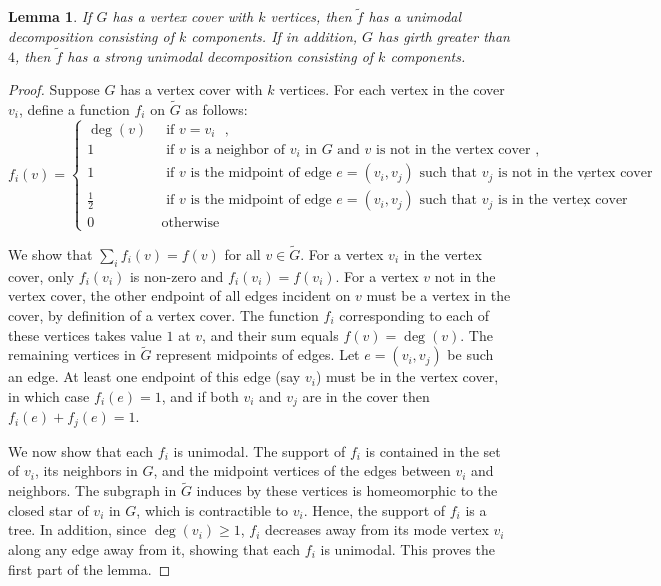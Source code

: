 \documentclass[11pt]{article}
\newtheorem{lem}[thm]{Lemma}
\begin{document}
\begin{lem}
    If $G$ has a vertex cover with $k$ vertices, then $\tilde{f}$ has a unimodal decomposition consisting of $k$ components. If in addition, $G$ has girth greater than $4$, then $\tilde{f}$ has a strong unimodal decomposition consisting of $k$ components.
\end{lem}
\begin{proof}
 Suppose $G$ has a vertex cover with $k$ vertices. For each vertex in the cover $v_i$, define a function $f_i$ on $\tilde{G}$ as follows:
 \[
 	f_i(v) = \begin{cases}
	\deg(v) & \ \text{ if $v = v_i$ }, \\
	1 & \ \text{ if $v$ is a neighbor of $v_i$ in $G$ and $v$ is not in the vertex cover },\\
	1 & \ \text{ if $v$ is the midpoint of edge $e = (v_i, v_j)$ such that $v_j$ is not in the vertex cover },\\
	\frac{1}{2} & \ \text{ if $v$ is the midpoint of edge $e = (v_i, v_j)$ such that $v_j$ is in the vertex cover }, \\
	0 & \ \text{otherwise}
	\end{cases}
 \]
 
 We show that $\sum_i f_i(v) = f(v)$ for all $v \in \tilde{G}$. For a vertex $v_i$ in the vertex cover, only $f_i(v_i)$ is non-zero and $f_i(v_i) = f(v_i)$. For a vertex $v$ not in the vertex cover, the other endpoint of all edges incident on $v$ must be a vertex in the cover, by definition of a vertex cover. The function $f_i$ corresponding to each of these vertices takes value $1$ at $v$, and their sum equals $f(v) = \deg(v)$. The remaining vertices in $\tilde{G}$ represent midpoints of edges. Let $e = (v_i,v_j)$ be such an edge. At least one endpoint of this edge (say $v_i$) must be in the vertex cover, in which case $f_i(e) = 1$, and if both $v_i$ and $v_j$ are in the cover then $f_i(e)+f_j(e) = 1$. 
 
We now show that each $f_i$ is unimodal. The support of $f_i$ is contained in the set of $v_i$, its neighbors in $G$, and the midpoint vertices of the edges between $v_i$ and neighbors. The subgraph in $\tilde{G}$ induces by these vertices is homeomorphic to the closed star of $v_i$ in $G$, which is contractible to $v_i$. Hence, the support of $f_i$ is a tree. In addition, since $\deg(v_i) \geq 1$, $f_i$ decreases away from its mode vertex $v_i$ along any edge away from it, showing that each $f_i$ is unimodal. This proves the first part of the lemma.
 

\end{proof}
\end{document}
